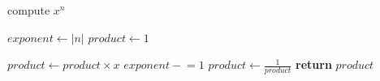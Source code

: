 \documentclass[a4paper, 12pt]{article}
\newcommand{\minuseq}{\mathrel{-}=}
\begin{document}
	
	\begin{algorithm}

		\renewcommand{\thealgorithm}{3.1.10}
		
		\caption{compute $x^{n}$}\label{power}
		
		\begin{algorithmic}[1]
			
			
			\State $exponent \gets |n|$
			\State $product \gets 1$
			
			 
				\State $product \gets product \times x$
				\State $exponent \minuseq 1$
			\EndWhile
			 
				\State $product \gets \frac{1}{product}$
			\EndIf
			\State \textbf{return} $product$ 
			\EndProcedure
			
		\end{algorithmic}

	\end{algorithm}
\end{document}
